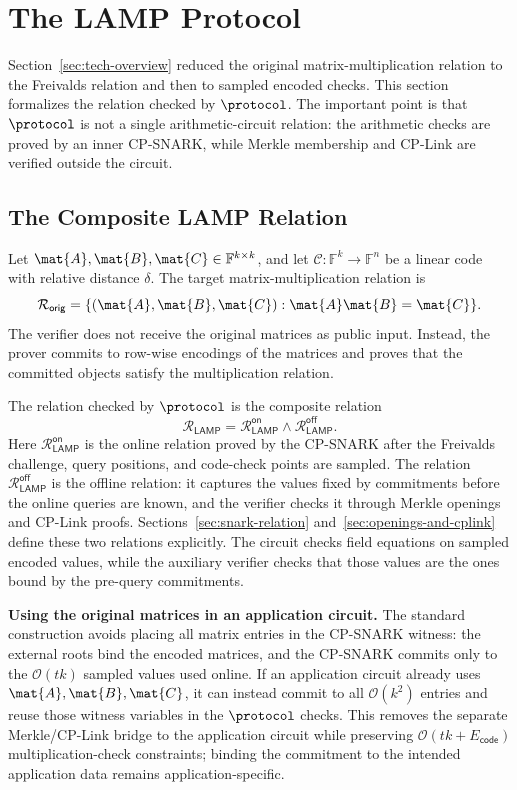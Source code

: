 \section{The LAMP Protocol}
\label{sec:construction}

Section~\ref{sec:tech-overview} reduced the original matrix-multiplication
relation to the Freivalds relation and then to sampled encoded checks.  This
section formalizes the relation checked by \(\protocol\).  The important point is
that \(\protocol\) is not a single arithmetic-circuit relation: the arithmetic
checks are proved by an inner CP-SNARK, while Merkle membership and CP-Link are
verified outside the circuit.

\subsection{The Composite LAMP Relation}
\label{sec:relation-chain}

Let \(\mat{A},\mat{B},\mat{C}\in\mathbb{F}^{k\times k}\), and let
\(\mathcal{C}:\mathbb{F}^k\to\mathbb{F}^n\) be a linear code with
relative distance \(\delta\).  The target matrix-multiplication relation is
\[
  \mathcal{R}_{\mathsf{orig}}
  =
  \{(\mat{A},\mat{B},\mat{C}) :
    \mat{A}\mat{B}=\mat{C}\}.
\]
The verifier does not receive the original matrices as public input.  Instead, the
prover commits to row-wise encodings of the matrices and proves that the
committed objects satisfy the multiplication relation.

The relation checked by \(\protocol\) is the composite relation
\[
  \mathcal{R}_{\mathsf{LAMP}}
  =
  \mathcal{R}_{\mathsf{LAMP}}^{\mathsf{on}}
  \land
  \mathcal{R}_{\mathsf{LAMP}}^{\mathsf{off}} .
\]
Here \(\mathcal{R}_{\mathsf{LAMP}}^{\mathsf{on}}\) is the online relation proved by the CP-SNARK after the Freivalds challenge, query positions, and code-check points are sampled.  The relation \(\mathcal{R}_{\mathsf{LAMP}}^{\mathsf{off}}\) is the offline relation: it captures the values fixed by commitments before the online queries are known, and the verifier checks it through Merkle openings and CP-Link proofs.
Sections~\ref{sec:snark-relation} and~\ref{sec:openings-and-cplink} define
these two relations explicitly.
The circuit checks field equations on sampled encoded values, while the auxiliary verifier checks that those values are the ones bound by the pre-query commitments.

\noindent\textbf{Using the original matrices in an application circuit.}
The standard construction avoids placing all matrix entries in the CP-SNARK
witness: the external roots bind the encoded matrices, and the CP-SNARK commits
only to the \(\mathcal{O}(tk)\) sampled values used online.  If an application
circuit already uses \(\mat{A},\mat{B},\mat{C}\), it can instead commit to all
\(\mathcal{O}(k^2)\) entries and reuse those witness variables in the
\(\protocol\) checks.  This removes the separate Merkle/CP-Link bridge to the
application circuit while preserving
\(\mathcal{O}(tk+E_{\mathsf{code}})\) multiplication-check constraints; binding
the commitment to the intended application data remains application-specific.

